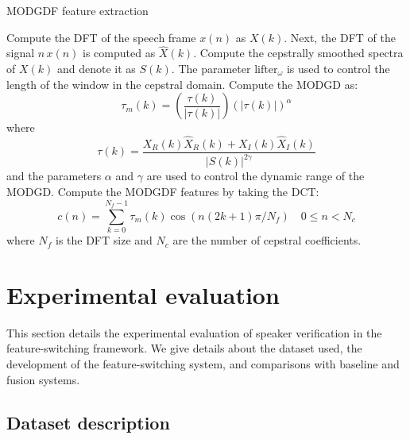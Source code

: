 \documentclass[preprint,12pt,5p]{elsarticle}
\begin{document}
\begin{algorithm}[!th]
\caption{MODGDF feature extraction}
\label{algo:modgd}
\begin{algorithmic}[1]

\STATE {}
\STATE Compute the DFT of the speech frame $x(n)$ as $X(k)$.
\STATE Next, the DFT of the signal $n\,x(n)$ is computed as $\hat{X}(k)$.
\STATE Compute the cepstrally smoothed spectra of $X(k)$ and denote it as
$S(k)$. The parameter $\textrm{lifter}_\omega$ is used to control the length of
the window in the cepstral domain. 
\STATE Compute the MODGD as:
\begin{equation*}
\tau_m(k) = \left(\frac{\tau(k)}{|\tau(k)|}\right) (|\tau(k)|)^\alpha
\end{equation*}
where
\begin{equation*}
\tau(k) = \frac{X_R(k)\hat{X}_R(k)+X_I(k)\hat{X}_I(k)}{|S(k)|^{2\gamma}}
\end{equation*}
and the parameters $\alpha$ and $\gamma$ are used to control the dynamic range
of the MODGD. 
\STATE Compute the MODGDF features by taking the DCT:
\begin{equation*}
c(n) = \sum_{k=0}^{N_f-1}\tau_m(k)\cos(n(2k+1)\pi/N_f) \quad 0 \leq n < N_c
\end{equation*}
where $N_f$ is the DFT size and $N_c$ are the number of cepstral coefficients. 

\end{algorithmic}
\end{algorithm}

\section{Experimental evaluation}
\label{sec:expts}
This section details the experimental evaluation of speaker verification in the
feature-switching framework. We give details about the dataset used, the
development of the feature-switching system, and comparisons with baseline and
fusion systems.

\flushend
\subsection{Dataset description}
\label{sec:dB}
\end{document}
